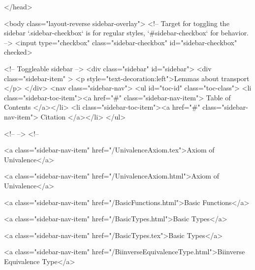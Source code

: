   
</head>




  <body class="layout-reverse sidebar-overlay">
    <!-- Target for toggling the sidebar `.sidebar-checkbox` is for regular
     styles, `#sidebar-checkbox` for behavior. -->
<input type="checkbox" class="sidebar-checkbox" id="sidebar-checkbox" checked>

<!-- Toggleable sidebar -->
<div class="sidebar" id="sidebar">
  <div class="sidebar-item" >
    <p style="text-decoration:left">Lemmas about transport </p>
  </div>
  <nav class="sidebar-nav">
    <ul id="toc-id" class="toc-class">
  <li class="sidebar-toc-item"><a href="#" class="sidebar-nav-item"> Table of Contents </a></li>
  <li class="sidebar-toc-item"><a href="#" class="sidebar-nav-item"> Citation </a></li>
</ul>


    <!--  -->
    <!-- 
      
    
      
    
      
    
      
    
      
        
      
    
      
        
          <a class="sidebar-nav-item" href="/UnivalenceAxiom.tex">Axiom of Univalence</a>
        
      
    
      
        
          <a class="sidebar-nav-item" href="/UnivalenceAxiom.html">Axiom of Univalence</a>
        
      
    
      
        
          <a class="sidebar-nav-item" href="/BasicFunctions.html">Basic Functions</a>
        
      
    
      
        
          <a class="sidebar-nav-item" href="/BasicTypes.html">Basic Types</a>
        
      
    
      
        
          <a class="sidebar-nav-item" href="/BasicTypes.tex">Basic Types</a>
        
      
    
      
        
          <a class="sidebar-nav-item" href="/BiinverseEquivalenceType.html">Biinverse Equivalence Type</a>
        

